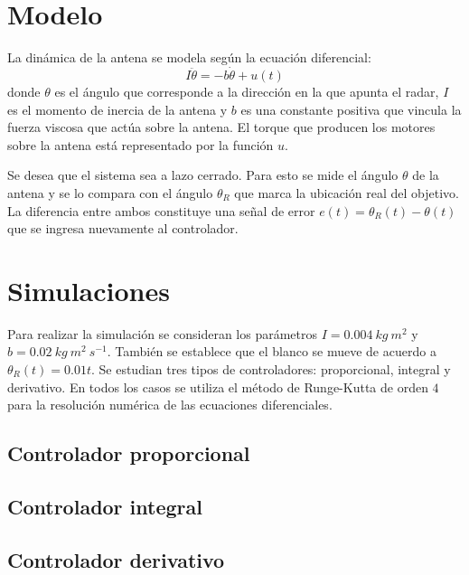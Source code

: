 \documentclass{sig-alternate}
\begin{document}
\section{Modelo}\label{modelo}
La din\'{a}mica de la antena se modela seg\'{u}n la ecuaci\'{o}n diferencial:
\begin{equation}
\label{dinamica_antena}
I \ddot\theta = - b \dot\theta + u(t)
\end{equation}
donde $\theta$ es el \'{a}ngulo que corresponde a la direcci\'{o}n en la que
apunta el radar, $I$ es el momento de inercia de la antena y $b$ es una 
constante positiva que vincula la fuerza viscosa que act\'{u}a sobre la antena.
El torque que producen los motores sobre la antena est\'{a} representado por 
la funci\'{o}n $u$.

Se desea que el sistema sea a lazo cerrado. Para esto se mide el \'{a}ngulo
$\theta$ de la antena y se lo compara con el \'{a}ngulo $\theta_{R}$ que marca
la ubicaci\'{o}n real del objetivo. La diferencia entre ambos constituye una
se\~{n}al de error $e(t) = \theta_{R}(t) - \theta(t)$ que se ingresa nuevamente 
al controlador.

\section{Simulaciones}\label{simulaciones}
Para realizar la simulaci\'{o}n se consideran los par\'{a}metros 
$I = 0.004\ kg\ m^{2}$ y $b = 0.02\ kg\  m^{2}\ s^{-1}$. Tambi\'{e}n se establece
que el blanco se mueve de acuerdo a $\theta_{R}(t) = 0.01 t$.
Se estudian tres tipos de controladores: proporcional, integral y derivativo.
En todos los casos se utiliza el m\'{e}todo de Runge-Kutta de orden $4$ para
la resoluci\'{o}n num\'{e}rica de las ecuaciones diferenciales.

\subsection{Controlador proporcional}\label{proporcional}

\subsection{Controlador integral}\label{integral}

\subsection{Controlador derivativo}\label{derivativo}
\end{document}
